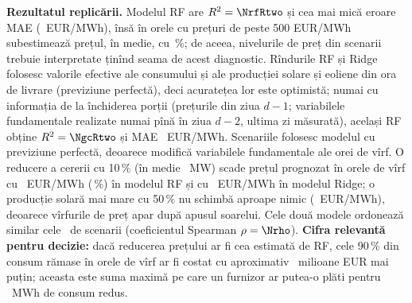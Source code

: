 %
{\textbf{Rezultatul replicării.} Modelul RF are $R^2 = \NrfRtwo$ și cea mai mică eroare MAE (\NrfMAE\ EUR/MWh), însă în orele cu prețuri de peste 500 EUR/MWh subestimează prețul, în medie, cu \NrfUnder\,\%; de aceea, nivelurile de preț din scenarii trebuie interpretate ținînd seama de acest diagnostic.
Rîndurile RF și Ridge folosesc valorile efective ale consumului și ale producției solare și eoliene din ora de livrare (previziune perfectă), deci acuratețea lor este optimistă;
numai cu informația de la închiderea porții (prețurile din ziua $d-1$; variabilele fundamentale realizate numai pînă în ziua $d-2$, ultima zi măsurată), același RF obține $R^2 = \NgcRtwo$ și MAE \NgcMAE\ EUR/MWh.
Scenariile folosesc modelul cu previziune perfectă, deoarece modifică variabilele fundamentale ale orei de vîrf.
O reducere a cererii cu 10\,\% (în medie \NdrTenMW\ MW) scade prețul prognozat în orele de vîrf cu \NdrTenRF\ EUR/MWh (\NdrTenRFpct\,\%) în modelul RF și cu \NdrTenRidge\ EUR/MWh în modelul Ridge; o producție solară mai mare cu 50\,\% nu schimbă aproape nimic (\NsolarRF\ EUR/MWh), deoarece vîrfurile de preț apar după apusul soarelui.
Cele două modele ordonează similar cele \NnGrid\ de scenarii (coeficientul Spearman $\rho = \Nrho$).
\textbf{Cifra relevantă pentru decizie:} dacă reducerea prețului ar fi cea estimată de RF, cele 90\,\% din consum rămase în orele de vîrf ar fi costat cu aproximativ \NdrTenSave\ milioane EUR mai puțin; aceasta este suma maximă pe care un furnizor ar putea-o plăti pentru \NdrTenMWh\ MWh de consum redus.}

